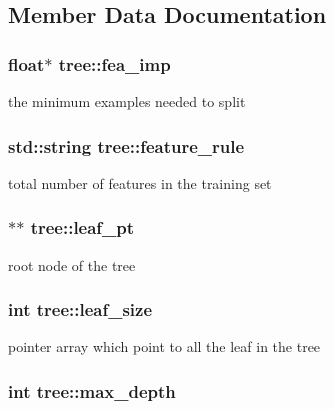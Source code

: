 \subsection{Member Data Documentation}
\hypertarget{classtree_ad335e57b2f4f2326825694311bcc69e7}{
\subsubsection[{fea\+\_\+imp}]{\setlength{\rightskip}{0pt plus 5cm}float$\ast$ tree\+::fea\+\_\+imp\hspace{0.3cm}{\ttfamily [protected]}}}\label{classtree_ad335e57b2f4f2326825694311bcc69e7}
the minimum examples needed to split \hypertarget{classtree_a5aba3b77a347165517a20d5fab94382d}{
\subsubsection[{feature\+\_\+rule}]{\setlength{\rightskip}{0pt plus 5cm}std\+::string tree\+::feature\+\_\+rule\hspace{0.3cm}{\ttfamily [protected]}}}\label{classtree_a5aba3b77a347165517a20d5fab94382d}
total number of features in the training set \hypertarget{classtree_ac697cf1868c26ac26f005e6ee8be9d43}{
\subsubsection[{leaf\+\_\+pt}]{$\ast$$\ast$ tree\+::leaf\+\_\+pt\hspace{0.3cm}{\ttfamily [protected]}}}\label{classtree_ac697cf1868c26ac26f005e6ee8be9d43}
root node of the tree \hypertarget{classtree_a551919e1402a700821694297623017fc}{
\subsubsection[{leaf\+\_\+size}]{\setlength{\rightskip}{0pt plus 5cm}int tree\+::leaf\+\_\+size\hspace{0.3cm}{\ttfamily [protected]}}}\label{classtree_a551919e1402a700821694297623017fc}
pointer array which point to all the leaf in the tree \hypertarget{classtree_a0a9f968fac827d3239be67488c34fb21}{
\subsubsection[{max\+\_\+depth}]{\setlength{\rightskip}{0pt plus 5cm}int tree\+::max\+\_\+depth\hspace{0.3cm}{\ttfamily [protected]}}}\label{classtree_a0a9f968fac827d3239be67488c34fb21}
